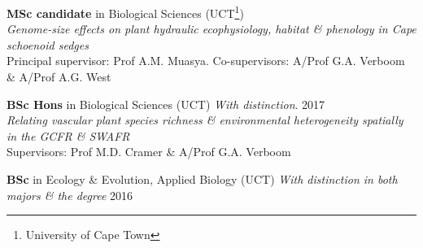 \begin{hangparas}{2em}{1}

\textbf{MSc candidate} in Biological Sciences {\small
  (UCT\footnote{University of Cape Town})}                                \\
\hspace{2em} \textit{Genome-size effects on plant
  hydraulic ecophysiology, habitat \& phenology in
  Cape schoenoid sedges}                                                  \\
\hspace{2em} Principal supervisor: Prof A.M. Muasya.
  Co-supervisors: A/Prof G.A. Verboom \&
  A/Prof A.G. West

\textbf{BSc Hons} in Biological Sciences {\small
  (UCT) \textit{With distinction}}.                  \hfill {\small 2017} \\
\hspace{2em} \textit{Relating vascular plant species
  richness \& environmental heterogeneity spatially
  in the GCFR \& SWAFR}                                                   \\
\hspace{2em} Supervisors: Prof M.D. Cramer \&
  A/Prof G.A. Verboom

\textbf{BSc} in Ecology \& Evolution, Applied
  Biology {\small (UCT) \textit{With distinction in
  both majors \& the degree}}                        \hfill {\small 2016}

\end{hangparas}
